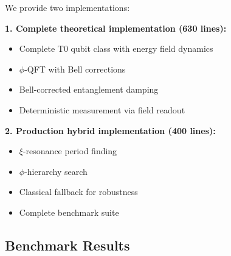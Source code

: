 We provide two implementations:

\textbf{1. Complete theoretical implementation (630 lines):}
\begin{itemize}
	\item Complete T0 qubit class with energy field dynamics
	\item $\phi$-QFT with Bell corrections
	\item Bell-corrected entanglement damping
	\item Deterministic measurement via field readout
\end{itemize}

\textbf{2. Production hybrid implementation (400 lines):}
\begin{itemize}
	\item $\xi$-resonance period finding
	\item $\phi$-hierarchy search
	\item Classical fallback for robustness
	\item Complete benchmark suite
\end{itemize}

\subsection{Benchmark Results}

\begin{table}[h]
	\centering
	\caption{T0-Shor performance on benchmark suite}
	\label{tab:benchmark}
\end{table}

